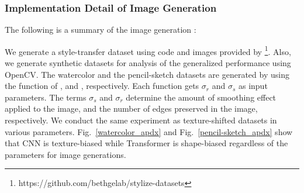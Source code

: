 \documentclass[letterpaper]{article} \usepackage{aaai23}  \usepackage{times}  \usepackage{helvet}  \usepackage{courier}  \usepackage[hyphens]{url}  \usepackage{graphicx} \urlstyle{rm} \def\UrlFont{\rm}  \usepackage{natbib}  \usepackage{caption} \frenchspacing  \setlength{\pdfpagewidth}{8.5in} \setlength{\pdfpageheight}{11in} \usepackage{algorithm}
\newcommand{\figref}[1]{Fig.~\ref{#1}}
\begin{document}
\begin{table}[h]
    \centering
    \caption{\textbf{Ablation study on the number of encoder and decoder layers.}}
    \label{table_abliation_L_apdx}
\end{table}


\subsubsection{Implementation Detail of Image Generation}
The following is a summary of the image generation :
\begin{table}[!h]
\end{table}

We generate a style-transfer dataset using code and images provided by \cite{geirhos2018imagenet}\footnote{https://github.com/bethgelab/stylize-datasets}. Also, we generate synthetic datasets for analysis of the generalized performance using OpenCV. The watercolor and the pencil-sketch datasets are generated by using the function of , and , respectively. Each function gets $\sigma_r$ and $\sigma_s$ as input parameters. The terms $\sigma_s$ and $\sigma_r$ determine the amount of smoothing effect applied to the image, and the number of edges preserved in the image, respectively. We conduct the same experiment as texture-shifted datasets in various parameters. \figref{watercolor_apdx} and \figref{pencil-sketch_apdx} show that CNN is texture-biased while Transformer is shape-biased regardless of the parameters for image generations.
\end{document}
